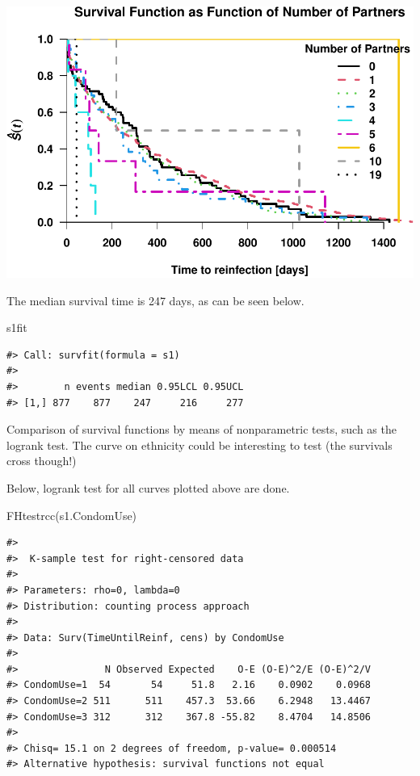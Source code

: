 \documentclass[
]{article}
\newenvironment{Shaded}{\begin{snugshade}}{\end{snugshade}}
\newcommand{\FunctionTok}[1]{\textcolor[rgb]{0.00,0.00,0.00}{#1}}
\newcommand{\NormalTok}[1]{#1}
\begin{document}
\includegraphics{practical_files/figure-latex/unnamed-chunk-10-1.pdf}

The median survival time is 247 days, as can be seen below.

\begin{Shaded}
\begin{Highlighting}[]
\NormalTok{s1fit}
\end{Highlighting}
\end{Shaded}

\begin{verbatim}
#> Call: survfit(formula = s1)
#> 
#>        n events median 0.95LCL 0.95UCL
#> [1,] 877    877    247     216     277
\end{verbatim}

Comparison of survival functions by means of nonparametric tests, such as the logrank test. The curve on ethnicity could be interesting to test (the survivals cross though!)

Below, logrank test for all curves plotted above are done.

\begin{Shaded}
\begin{Highlighting}[]
\FunctionTok{FHtestrcc}\NormalTok{(s1.CondomUse)}
\end{Highlighting}
\end{Shaded}

\begin{verbatim}
#> 
#>  K-sample test for right-censored data
#> 
#> Parameters: rho=0, lambda=0
#> Distribution: counting process approach
#> 
#> Data: Surv(TimeUntilReinf, cens) by CondomUse
#> 
#>               N Observed Expected    O-E (O-E)^2/E (O-E)^2/V
#> CondomUse=1  54       54     51.8   2.16    0.0902    0.0968
#> CondomUse=2 511      511    457.3  53.66    6.2948   13.4467
#> CondomUse=3 312      312    367.8 -55.82    8.4704   14.8506
#> 
#> Chisq= 15.1 on 2 degrees of freedom, p-value= 0.000514
#> Alternative hypothesis: survival functions not equal
\end{verbatim}
\end{document}
